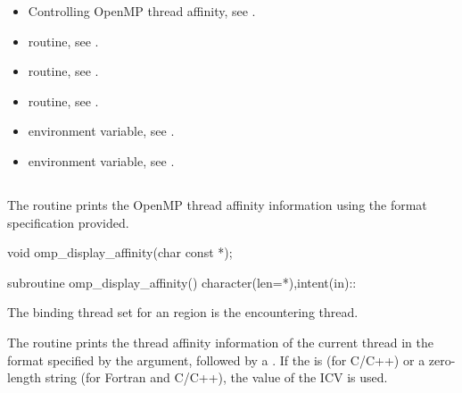 \crossreferences
\begin{itemize}
\item Controlling OpenMP thread affinity, see
.

\item {} routine, 
see .

\item {} routine, see .

\item {} routine, see .

\item {} environment variable, see
.

\item {} environment variable, see
.
\end{itemize}



\subsection{}
\label{subsec:omp_display_affinity}

\summary
The  routine prints the OpenMP thread 
affinity information using the format specification provided.

\format
\begin{ccppspecific}
\begin{ompcFunction}
void omp_display_affinity(char const *);
\end{ompcFunction}
\end{ccppspecific}


\begin{fortranspecific}
\begin{ompfSubroutine}
subroutine omp_display_affinity()
character(len=*),intent(in)::
\end{ompfSubroutine}
\end{fortranspecific}

\binding
The binding thread set for an  region 
is the encountering thread.

\effect
The  routine prints the thread affinity 
information of the current thread in the format specified by the 
 argument, followed by a . If the 
 is  (for C/C++) or a zero-length string
(for Fortran and C/C++), the value of the  ICV is used.

